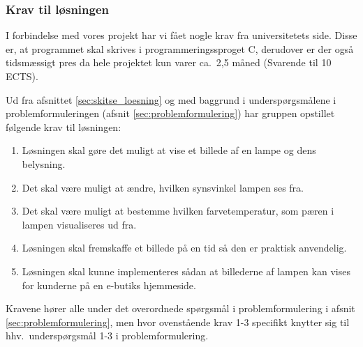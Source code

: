 \subsubsection{Krav til løsningen}
\label{sec:krav}

I forbindelse med vores projekt har vi fået nogle krav fra universitetets side. Disse er, at programmet skal skrives i programmeringssproget C, derudover er der også tidsmæssigt pres da hele projektet kun varer ca.\ 2,5 måned (Svarende til 10 ECTS). 

Ud fra afsnittet \ref{sec:skitse_loesning} og med baggrund i underspørgsmålene i problemformuleringen (afsnit \ref{sec:problemformulering}) har gruppen opstillet følgende krav til løsningen:
\begin{enumerate}
    \item Løsningen skal gøre det muligt at vise et billede af en lampe og dens belysning.
    \item Det skal være muligt at ændre, hvilken synsvinkel lampen ses fra.
    \item Det skal være muligt at bestemme hvilken farvetemperatur, som pæren i lampen visualiseres ud fra.
    \item Løsningen skal fremskaffe et billede på en tid så den er praktisk anvendelig.
    \item Løsningen skal kunne implementeres sådan at billederne af lampen kan vises for kunderne på en e-butiks hjemmeside.
\end{enumerate}

Kravene hører alle under det overordnede spørgsmål i problemformulering i afsnit \ref{sec:problemformulering}, men hvor ovenstående krav 1-3 specifikt knytter sig til hhv.\ underspørgsmål 1-3 i problemformulering.